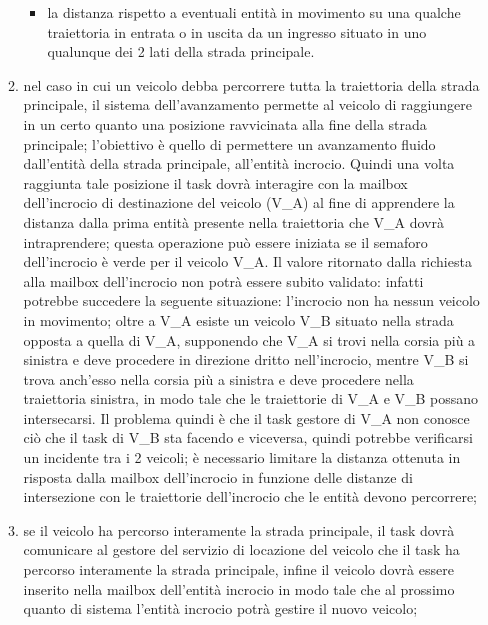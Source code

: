 \begin{enumerate}
\begin{enumerate}
\begin{itemize}
\item la distanza rispetto a eventuali entità in movimento su una qualche traiettoria in entrata o in uscita da un ingresso situato in uno qualunque dei 2 lati della strada principale. 
\end{itemize}
\item nel caso in cui un veicolo debba percorrere tutta la traiettoria della strada principale, il sistema dell'avanzamento permette al veicolo di raggiungere in un certo quanto una posizione ravvicinata alla fine della strada principale; l'obiettivo è quello di permettere un avanzamento fluido dall'entità della strada principale, all'entità incrocio. Quindi una volta raggiunta tale posizione il task dovrà interagire con la mailbox dell'incrocio di destinazione del veicolo (V\_A) al fine di apprendere la distanza dalla prima entità presente nella traiettoria che V\_A dovrà intraprendere; questa operazione può essere iniziata se il semaforo dell'incrocio è verde per il veicolo V\_A. Il valore ritornato dalla richiesta alla mailbox dell'incrocio non potrà essere subito validato: infatti potrebbe succedere la seguente situazione: l'incrocio non ha nessun veicolo in movimento; oltre a V\_A esiste un veicolo V\_B situato nella strada opposta a quella di V\_A, supponendo che V\_A si trovi nella corsia più a sinistra e deve procedere in direzione dritto nell'incrocio, mentre V\_B si trova anch'esso nella corsia più a sinistra e deve procedere nella traiettoria sinistra, in modo tale che le traiettorie di V\_A e V\_B possano intersecarsi. Il problema quindi è che il task gestore di V\_A non conosce ciò che il task di V\_B sta facendo e viceversa, quindi potrebbe verificarsi un incidente tra i 2 veicoli; è necessario limitare la distanza ottenuta in risposta dalla mailbox dell'incrocio in funzione delle distanze di intersezione con le traiettorie dell'incrocio che le entità devono percorrere;
\item se il veicolo ha percorso interamente la strada principale, il task dovrà comunicare al gestore del servizio di locazione del veicolo che il task ha percorso interamente la strada principale, infine il veicolo dovrà essere inserito nella mailbox dell'entità incrocio in modo tale che al prossimo quanto di sistema l'entità incrocio potrà gestire il nuovo veicolo;

\end{enumerate}
\end{enumerate}
